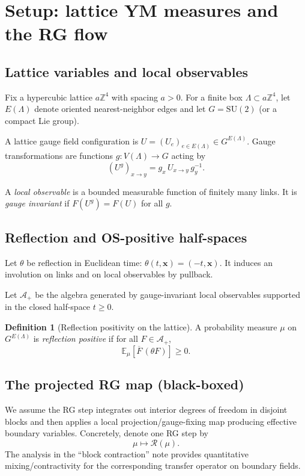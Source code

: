 \documentclass[11pt]{article}
\theoremstyle{definition}
\newtheorem{definition}[theorem]{Definition}
\newcommand{\E}{\mathbb{E}}
\newcommand{\1}{\mathbf{1}}
\newcommand{\Z}{\mathbb{Z}}
\newcommand{\cA}{\mathcal{A}}
\begin{document}
\section{Setup: lattice YM measures and the RG flow}

\subsection{Lattice variables and local observables}
Fix a hypercubic lattice \(a\Z^4\) with spacing \(a>0\). For a finite box \(\Lambda\subset a\Z^4\), let \(E(\Lambda)\) denote oriented nearest-neighbor edges and let \(G=\mathrm{SU}(2)\) (or a compact Lie group).

A lattice gauge field configuration is \(U=(U_e)_{e\in E(\Lambda)}\in G^{E(\Lambda)}\). Gauge transformations are functions \(g:V(\Lambda)\to G\) acting by
\[
(U^g)_{x\to y} = g_x\, U_{x\to y}\, g_y^{-1}.
\]

A \emph{local observable} is a bounded measurable function of finitely many links. It is \emph{gauge invariant} if \(F(U^g)=F(U)\) for all \(g\).

\subsection{Reflection and OS-positive half-spaces}
Let \(\theta\) be reflection in Euclidean time: \(\theta(t,\mathbf{x})=(-t,\mathbf{x})\). It induces an involution on links and on local observables by pullback.

Let \(\cA_+\) be the algebra generated by gauge-invariant local observables supported in the closed half-space \(t\ge 0\).

\begin{definition}[Reflection positivity on the lattice]
A probability measure \(\mu\) on \(G^{E(\Lambda)}\) is \emph{reflection positive} if for all \(F\in \cA_+\),
\[
\E_{\mu}[\overline{F}\, (\theta F)] \ge 0.
\]
\end{definition}

\subsection{The projected RG map (black-boxed)}
We assume the RG step integrates out interior degrees of freedom in disjoint blocks and then applies a local projection/gauge-fixing map producing effective boundary variables. Concretely, denote one RG step by
\[
\mu \mapsto \mathcal{R}(\mu).
\]
The analysis in the ``block contraction'' note provides quantitative mixing/contractivity for the corresponding transfer operator on boundary fields.
\end{document}

